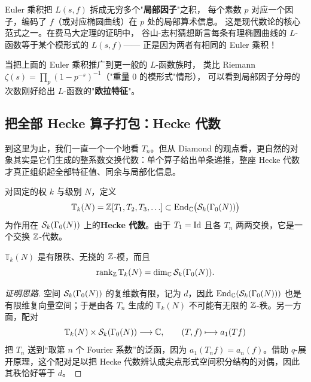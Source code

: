 \begin{remark}
Euler 乘积把 $L(s,f)$ 拆成无穷多个"\textbf{局部因子}"之积，
每个素数 $p$ 对应一个因子，编码了 $f$（或对应椭圆曲线）在 $p$ 处的局部算术信息。
这是现代数论的核心范式之一。在费马大定理的证明中，
谷山-志村猜想断言每条有理椭圆曲线的 $L$-函数等于某个模形式的 $L(s,f)$——
正是因为两者有相同的 Euler 乘积！
\end{remark}

\begin{example}
当把上面的 Euler 乘积推广到更一般的 $L$-函数族时，
类比 Riemann $\zeta(s) = \prod_p (1-p^{-s})^{-1}$（"重量 0 的模形式"情形），
可以看到局部因子分母的次数刚好给出 $L$-函数的"\textbf{欧拉特征}"。
\end{example}

\subsection*{把全部 Hecke 算子打包：Hecke 代数}

到这里为止，我们一直一个一个地看 $T_n$。但从 Diamond 的观点看，更自然的对象其实是它们生成的整系数交换代数：单个算子给出单条递推，整座 Hecke 代数才真正组织起全部特征值、同余与局部化信息。

\begin{definition}[Hecke 代数]
\label{def:hecke-algebra}
对固定的权 $k$ 与级别 $N$，定义
\[
  \mathbb{T}_k(N)=\mathbb{Z}[T_1,T_2,T_3,\ldots]
  \subset \mathrm{End}_{\mathbb{C}}\bigl(\mathcal{S}_k(\Gamma_0(N))\bigr)
\]
为作用在 $\mathcal{S}_k(\Gamma_0(N))$ 上的\textbf{Hecke 代数}。由于 $T_1=\mathrm{Id}$ 且各 $T_n$ 两两交换，它是一个交换 $\mathbb{Z}$-代数。
\end{definition}

\begin{proposition}[有限秩性]
\label{prop:hecke-finite-rank}
$\mathbb{T}_k(N)$ 是有限秩、无挠的 $\mathbb{Z}$-模，而且
\[
  \operatorname{rank}_{\mathbb{Z}}\mathbb{T}_k(N)=\dim_{\mathbb{C}}\mathcal{S}_k(\Gamma_0(N)).
\]
\end{proposition}

\begin{proof}[证明思路]
空间 $\mathcal{S}_k(\Gamma_0(N))$ 的复维数有限，记为 $d$，因此 $\mathrm{End}_{\mathbb{C}}(\mathcal{S}_k(\Gamma_0(N)))$ 也是有限维复向量空间；于是由各 $T_n$ 生成的 $\mathbb{T}_k(N)$ 不可能有无限的 $\mathbb{Z}$-秩。另一方面，配对
\[
  \mathbb{T}_k(N)\times \mathcal{S}_k(\Gamma_0(N))\longrightarrow \mathbb{C},
  \qquad (T,f)\longmapsto a_1(Tf)
\]
把 $T_n$ 送到“取第 $n$ 个 Fourier 系数”的泛函，因为 $a_1(T_nf)=a_n(f)$。借助 $q$-展开原理，这个配对足以把 Hecke 代数辨认成尖点形式空间积分结构的对偶，因此其秩恰好等于 $d$。
\end{proof}

